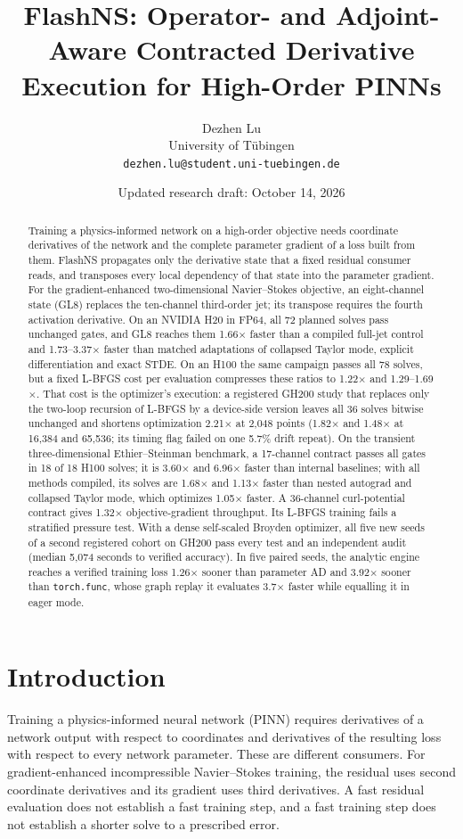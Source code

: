 \documentclass[11pt]{article}
\title{FlashNS: Operator- and Adjoint-Aware Contracted Derivative Execution for High-Order PINNs}
\author{Dezhen Lu\\University of Tübingen\\\texttt{dezhen.lu@student.uni-tuebingen.de}}
\date{Updated research draft: October 14, 2026}
\begin{document}
\maketitle

\begin{abstract}
Training a physics-informed network on a high-order objective needs
coordinate derivatives of the network and the complete parameter gradient
of a loss built from them. FlashNS propagates only the derivative state that
a fixed residual consumer reads, and transposes every local dependency of
that state into the parameter gradient. For the gradient-enhanced
two-dimensional Navier--Stokes objective, an eight-channel state (GL8)
replaces the ten-channel third-order jet; its transpose requires the fourth
activation derivative. On an NVIDIA H20 in FP64, all 72 planned solves pass
unchanged gates, and GL8 reaches them 1.66$\times$ faster than a
compiled full-jet control and 1.73--3.37$\times$ faster than matched
adaptations of collapsed Taylor mode, explicit differentiation and exact
STDE. On an H100 the same campaign passes all 78 solves, but a fixed L-BFGS
cost per evaluation compresses these ratios to 1.22$\times$ and
1.29--1.69$\times$. That cost is the optimizer's execution: a registered
GH200 study that replaces only the two-loop recursion of L-BFGS by a
device-side version leaves all 36 solves bitwise unchanged and shortens
optimization 2.21$\times$ at 2,048 points (1.82$\times$ and 1.48$\times$
at 16,384 and 65,536; its timing flag failed on one 5.7\% drift repeat). On the transient three-dimensional Ethier--Steinman
benchmark, a 17-channel contract passes all gates in 18 of 18 H100 solves;
it is 3.60$\times$ and 6.96$\times$ faster than internal baselines; with all
methods compiled, its solves are 1.68$\times$ and 1.13$\times$ faster than
nested autograd and collapsed Taylor mode, which optimizes 1.05$\times$
faster. A 36-channel curl-potential contract
gives 1.32$\times$ objective-gradient throughput. Its L-BFGS training fails
a stratified pressure test. With a dense self-scaled Broyden optimizer, all
five new seeds of a second registered cohort on GH200 pass every test and an
independent audit (median 5,074 seconds to verified accuracy). In five
paired seeds, the analytic engine reaches a verified training loss
1.26$\times$ sooner than parameter AD and 3.92$\times$ sooner than
\texttt{torch.func}, whose graph replay it evaluates 3.7$\times$ faster
while equalling it in eager mode.
\end{abstract}

\section{Introduction}
Training a physics-informed neural network (PINN) requires derivatives of a
network output with respect to coordinates and derivatives of the resulting
loss with respect to every network parameter. These are different consumers.
For gradient-enhanced incompressible Navier--Stokes training, the residual
uses second coordinate derivatives and its gradient uses third derivatives.
A fast residual evaluation does not establish a fast training step, and a
fast training step does not establish a shorter solve to a prescribed error.
\end{document}
